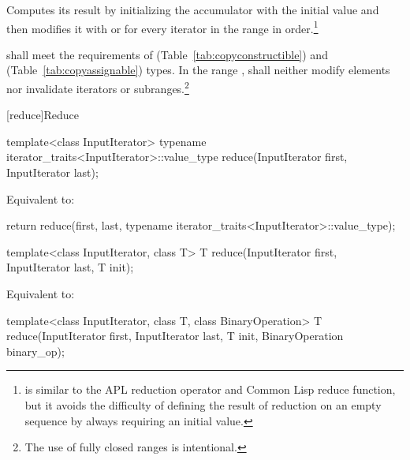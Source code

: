 \begin{itemdescr}
\pnum
\effects
Computes its result by initializing the accumulator
with the initial value
and then modifies it with
or
for every iterator
in the range 
in order.\footnote{
is similar to the APL reduction operator and Common Lisp reduce function, but
it avoids the difficulty of defining the result of reduction on an empty
sequence by always requiring an initial value.}

\pnum
\requires
{} shall meet the requirements of  (Table~\ref{tab:copyconstructible})
and  (Table~\ref{tab:copyassignable}) types.
In the range
,
shall neither modify elements nor invalidate iterators or subranges.\footnote{The use of fully closed ranges is intentional.}
\end{itemdescr}

[reduce]{Reduce}

%
\begin{itemdecl}
template<class InputIterator>
  typename iterator_traits<InputIterator>::value_type
    reduce(InputIterator first, InputIterator last);
\end{itemdecl}

\begin{itemdescr}
\pnum
\effects
Equivalent to:
\begin{codeblock}
return reduce(first, last, typename iterator_traits<InputIterator>::value_type{});
\end{codeblock}
\end{itemdescr}

%
\begin{itemdecl}
template<class InputIterator, class T>
  T reduce(InputIterator first, InputIterator last, T init);
\end{itemdecl}

\begin{itemdescr}
\pnum
\effects
Equivalent to: 
\end{itemdescr}

%
\begin{itemdecl}
template<class InputIterator, class T, class BinaryOperation>
  T reduce(InputIterator first, InputIterator last, T init,
           BinaryOperation binary_op);
\end{itemdecl}

